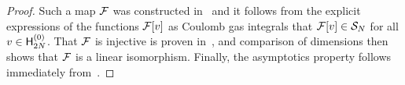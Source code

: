 \documentclass[oneside,english]{amsart}
\numberwithin{equation}{section}
\numberwithin{figure}{section}
\theoremstyle{plain}
\theoremstyle{plain}
\theoremstyle{plain}
\theoremstyle{remark}
\theoremstyle{plain}
\theoremstyle{plain}
\theoremstyle{plain}
\theoremstyle{plain}
\theoremstyle{plain}
\theoremstyle{plain}
\theoremstyle{plain}
\theoremstyle{plain}
\newcommand{\red}[1]{{\color{red} #1}}
\begin{document}
\begin{proof}
Such a map $\mathcal{F}$
was constructed in~\cite{KP-conformally_covariant_boundary_correlation_functions_with_a_quantum_group} 
and it follows from the explicit expressions of the functions $\mathcal{F}[v]$ as Coulomb gas integrals
that $\mathcal{F}[v] \in \mathcal{S}_N$ for all $v \in \mathsf{H}_{2N}^{(0)}$.
That $\mathcal{F}$ is injective is proven in~\cite{KP-pure_partition_functions_of_multiple_SLEs},
and comparison of dimensions then shows that $\mathcal{F}$ is a linear isomorphism.
Finally, the asymptotics property follows immediately 
from~\cite[Theorem~4.17(ASY)]{KP-conformally_covariant_boundary_correlation_functions_with_a_quantum_group}.
\end{proof}
\end{document}
